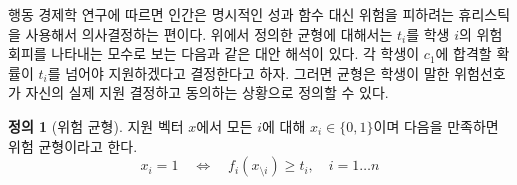 \documentclass[12pt]{article} %
\newif\ifEN
\theoremstyle{definition}
\newtheorem{definition}{Definition}
\theoremstyle{definition}
\newtheorem{definition}{정의}
\begin{document}
\ifEN {
Behavioral economics research tells us that humans often make decisions in terms of risk-mitigating heuristics rather than explicit payoff functions. The notion of equilibrium defined above admits an alternative interpretation in which $t_i$ is a parameter that represents student $i$’s risk aversion. In particular, suppose that each student resolves to apply to $c_1$ only if her probability of admission is at least $t_i$. Then we can define an equilibrium as an admissions vector in which students’ stated risk preferences accord with their actual application decisions. 
\begin{definition}[Risk equilibrium]
The application vector $x$ is said to be a \emph{risk equilibrium} if and only if $x_i \in \{0, 1\}$ and
\begin{equation}
x_i = 1 \quad \iff \quad f_i(x_{\setminus i}) \geq t_i,\quad i = 1\dots n
\end{equation}
\end{definition}
} \else {
행동 경제학 연구에 따르면 인간은 명시적인 성과 함수 대신 위험을 피하려는 휴리스틱을 사용해서 의사결정하는 편이다. 위에서 정의한 균형에 대해서는 $t_i$를 학생 $i$의 위험회피를 나타내는 모수로 보는 다음과 같은 대안 해석이 있다. 각 학생이 $c_1$에 합격할 확률이 $t_i$를 넘어야 지원하겠다고 결정한다고 하자. 그러면 균형은 학생이 말한 위험선호가 자신의 실제 지원 결정하고 동의하는 상황으로 정의할 수 있다.
\begin{definition}[위험 균형]
지원 벡터 $x$에서 모든 $i$에 대해 $x_i \in \{0, 1\}$이며 다음을 만족하면 위험 균형이라고 한다.
\begin{equation}
x_i = 1 \quad \iff \quad f_i(x_{\setminus i}) \geq t_i,\quad i = 1\dots n
\end{equation}
\end{definition}
} \fi
\end{document}
